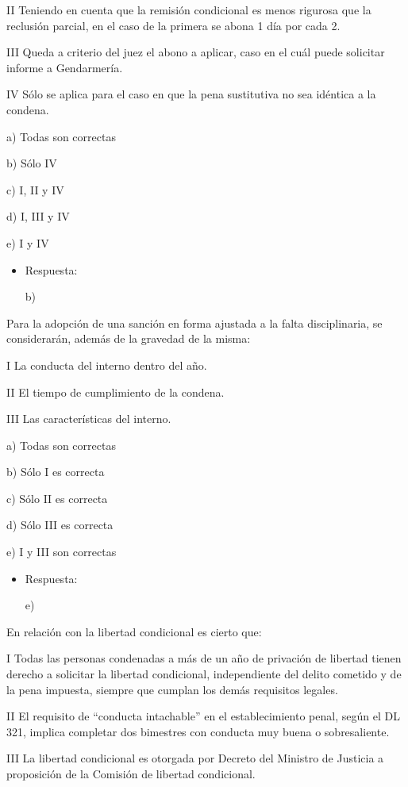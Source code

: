 \documentclass[letterpaper, 11pt]{article}
\begin{document}
II Teniendo en cuenta que la remisión condicional es menos rigurosa
que la reclusión parcial, en el caso de la primera se abona 1 día por
cada 2.

III Queda a criterio del juez el abono a aplicar, caso en el cuál
puede solicitar informe a Gendarmería.

IV Sólo se aplica para el caso en que la pena sustitutiva no sea
idéntica a la condena.

a) Todas son correctas

b) Sólo IV

c) I, II y IV

d) I, III y IV

e) I y IV

\begin{itemize}
\item Respuesta:

b)
\end{itemize}


Para la adopción de una sanción en forma ajustada a la falta
disciplinaria, se considerarán, además de la gravedad de la misma:


I La conducta del interno dentro del año.

II El tiempo de cumplimiento de la condena.

III Las características del interno.


a) Todas son correctas

b) Sólo I es correcta

c) Sólo II es correcta

d) Sólo III es correcta

e) I y III son correctas

\begin{itemize}
\item Respuesta:

e)
\end{itemize}


En relación con la libertad condicional es cierto que:

I Todas las personas condenadas a más de un año de privación de
libertad tienen derecho a solicitar la libertad condicional,
independiente del delito cometido y de la pena impuesta, siempre que
cumplan los demás requisitos legales.

II El requisito de “conducta intachable” en el establecimiento penal,
según el DL 321, implica completar dos bimestres con conducta muy
buena o sobresaliente.

III La libertad condicional es otorgada por Decreto del Ministro de
Justicia a proposición de la Comisión de libertad condicional.
\end{document}
